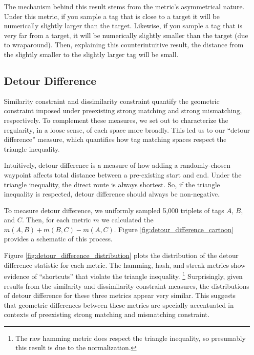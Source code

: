 The mechanism behind this result stems from the metric's asymmetrical nature.
Under this metric, if you sample a tag that is close to a target it will be numerically slightly larger than the target.
Likewise, if you sample a tag that is very far from a target, it will be numerically slightly smaller than the target (due to wraparound).
Then, explaining this counterintuitive result, the distance from the slightly smaller to the slightly larger tag will be small.

\subsection{Detour Difference} \label{sec:detour_difference}



Similarity constraint and dissimilarity constraint quantify the geometric constraint imposed under preexisting strong matching and strong mismatching, respectively.
To complement these measures, we set out to characterize the regularity, in a loose sense, of each space more broadly.
This led us to our ``detour difference'' measure, which quantifies how tag matching spaces respect the triangle inequality.

Intuitively, detour difference is a measure of how adding a randomly-chosen waypoint affects total distance between a pre-existing start and end.
Under the triangle inequality, the direct route is always shortest.
So, if the triangle inequality is respected, detour difference should always be non-negative.

To measure detour difference, we uniformly sampled 5,000 triplets of tags $A$, $B$, and $C$.
Then, for each metric $m$ we calculated the $m(A, B) + m(B, C) - m(A, C)$.
Figure \ref{fig:detour_difference_cartoon} provides a schematic of this process.

Figure \ref{fig:detour_difference_distribution} plots the distribution of the detour difference statistic for each metric.
The hamming, hash, and streak metrics show evidence of ``shortcuts'' that violate the triangle inequality.
\footnote{
The raw hamming metric does respect the triangle inequality, so presumably this result is due to the normalization.
}
Surprisingly, given results from the similarity and dissimilarity constraint measures, the distributions of detour difference for these three metrics appear very similar.
This suggests that geometric differences between these metrics are specially accentuated in contexts of preexisting strong matching and mismatching constraint.
